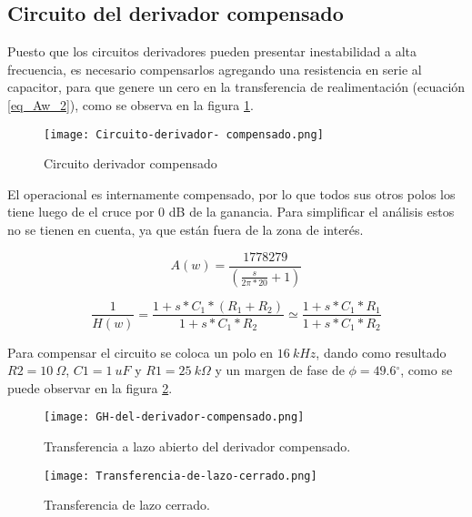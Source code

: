 \subsection{Circuito del derivador compensado}

\noindent Puesto que los circuitos derivadores pueden presentar inestabilidad a alta frecuencia, es necesario compensarlos agregando una resistencia en serie al capacitor, para que genere un cero en la transferencia de realimentaci\'{o}n (ecuación \ref{eq_Aw_2}), como se observa en la figura  \ref{fig:img_Circuito_derivador_compensado}.

\begin{figure}[H]
	\centering
	\texttt{[image: Circuito-derivador- compensado.png]}
	\caption{Circuito derivador compensado}
	\label{fig:img_Circuito_derivador_compensado}
\end{figure}

\noindent El operacional es internamente compensado, por lo que todos sus otros polos los tiene luego de el cruce por 0 dB de la ganancia. Para simplificar el an\'{a}lisis estos no se tienen en cuenta, ya que est\'{a}n fuera de la zona de inter\'{e}s.

\begin{equation} \label{eq_Aw_1}
	A(w)=\frac{1778279}{(\frac{s}{2\pi *20}+1)}
\end{equation} 

\begin{equation} \label{eq_Aw_2}
	\frac{1}{H(w)}=\frac{1+s*C_1*(R_1+R_2)}{1+s*C_1*R_2}\simeq \frac{1+s*C_1*R_1}{1+s*C_1*R_2}
\end{equation}

\noindent Para compensar el circuito se coloca un polo en $16 \:kHz$, dando como resultado $R2=10\:\Omega$, $C1=1\:uF$ y $R1=25\: k\Omega$ y un margen de fase de $\phi =49.6{}^\circ $, como se puede observar en la figura \ref{fig:img_GH del derivador compensado}.

\begin{figure}[H]
	\centering
	\texttt{[image: GH-del-derivador-compensado.png]}
	\caption{Transferencia a lazo abierto del derivador compensado.}
	\label{fig:img_GH del derivador compensado}
\end{figure}

\begin{figure}[H]
	\centering
	\texttt{[image: Transferencia-de-lazo-cerrado.png]}
	\caption{Transferencia de lazo cerrado.}
	\label{fig:img_Transferencia-de-lazo-cerrado}
\end{figure}


